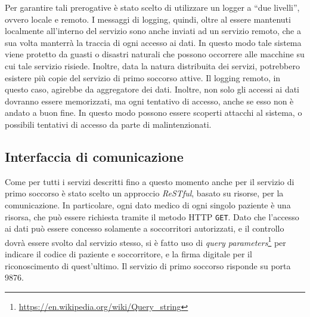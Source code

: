 \documentclass[a4paper,12pt]{report}
\begin{document}
Per garantire tali prerogative è stato scelto di utilizzare un logger a ``due livelli'', ovvero locale e remoto. I messaggi di logging, quindi, oltre al essere mantenuti localmente all'interno del servizio sono anche inviati ad un servizio remoto, che a sua volta manterrà la traccia di ogni accesso ai dati. In questo modo tale sistema viene protetto da guasti o disastri naturali che possono occorrere alle macchine su cui tale servizio risiede. Inoltre, data la natura distribuita dei servizi, potrebbero esistere più copie del servizio di primo soccorso attive. Il logging remoto, in questo caso, agirebbe da aggregatore dei dati. Inoltre, non solo gli accessi ai dati dovranno essere memorizzati, ma ogni tentativo di accesso, anche se esso non è andato a buon fine. In questo modo possono essere scoperti attacchi al sistema, o possibili tentativi di accesso da parte di malintenzionati. 
\subsection{Interfaccia di comunicazione} \label{firstAidCom}
Come per tutti i servizi descritti fino a questo momento anche per il servizio di primo soccorso è stato scelto un approccio \emph{ReSTful}, basato su risorse, per la comunicazione. In particolare, ogni dato medico di ogni singolo paziente è una risorsa, che può essere richiesta tramite il metodo HTTP \texttt{GET}. Dato che l'accesso ai dati può essere concesso solamente a soccorritori autorizzati, e il controllo dovrà essere svolto dal servizio stesso, si è fatto uso di \emph{query parameters}\footnote{\url{https://en.wikipedia.org/wiki/Query_string}} per indicare il codice di paziente e soccorritore, e la firma digitale per il riconoscimento di quest'ultimo. Il servizio di primo soccorso risponde su porta 9876.
\end{document}
